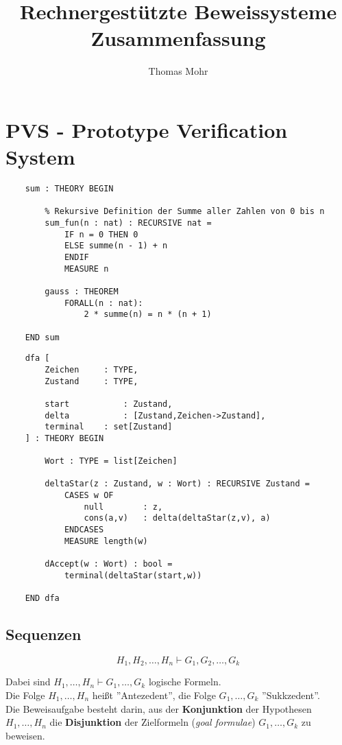 \documentclass{scrartcl}
\title{Rechnergestützte Beweissysteme \\ Zusammenfassung}
\author{Thomas Mohr}
\date{}
\begin{document}
\maketitle

\section{PVS - Prototype Verification System}

\begin{lstlisting}
	sum : THEORY BEGIN
	
		% Rekursive Definition der Summe aller Zahlen von 0 bis n
		sum_fun(n : nat) : RECURSIVE nat =
			IF n = 0 THEN 0
			ELSE summe(n - 1) + n
			ENDIF
			MEASURE n
			
		gauss : THEOREM
			FORALL(n : nat):
				2 * summe(n) = n * (n + 1)
				
	END sum
\end{lstlisting}

\begin{lstlisting}
	dfa [
		Zeichen		: TYPE,
		Zustand		: TYPE,
		
		start			: Zustand,
		delta			: [Zustand,Zeichen->Zustand],
		terminal	: set[Zustand]
	] : THEORY BEGIN
	
		Wort : TYPE = list[Zeichen]
		
		deltaStar(z : Zustand, w : Wort) : RECURSIVE Zustand =
			CASES w OF
				null		: z,
				cons(a,v)	: delta(deltaStar(z,v), a)
			ENDCASES
			MEASURE length(w)
			
		dAccept(w : Wort) : bool =
			terminal(deltaStar(start,w))
	
	END dfa
\end{lstlisting}

\subsection{Sequenzen}

\begin{equation*}
	H_1, H_2, \ldots, H_n \vdash G_1, G_2, \ldots, G_k
\end{equation*}

Dabei sind $ H_1, \ldots, H_n \vdash G_1, \ldots, G_k $ logische Formeln. \\
Die Folge $ H_1, \ldots, H_n $ heißt ''Antezedent'', die Folge $ G_1, \ldots, G_k $ ''Sukkzedent''. \\

Die Beweisaufgabe besteht darin, aus der \textbf{Konjunktion} der Hypothesen $ H_1, \ldots, H_n $ die \textbf{Disjunktion} der Zielformeln (\textit{goal formulae})  $ G_1, \ldots, G_k $ zu beweisen. \\
\end{document}
